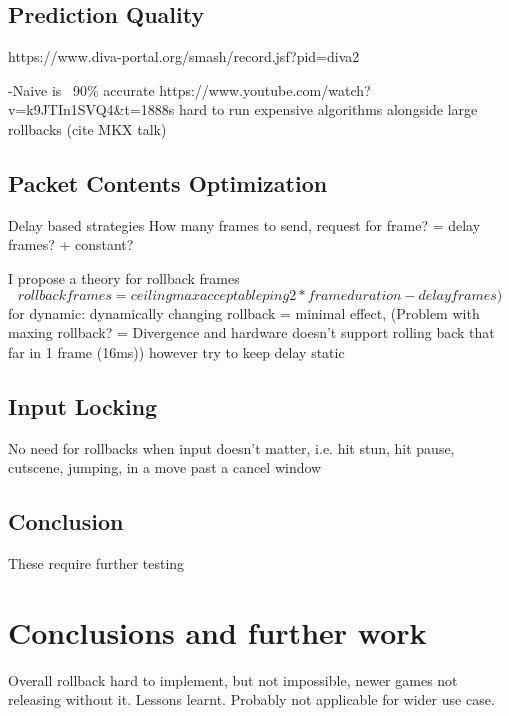 \documentclass{entcs}
\begin{document}
\subsection{Prediction Quality}
https://www.diva-portal.org/smash/record.jsf?pid=diva2%

-Naive is ~90\% accurate {https://www.youtube.com/watch?v=k9JTIn1SVQ4\&t=1888s}
hard to run expensive algorithms alongside large rollbacks (cite MKX talk)

\subsection{Packet Contents Optimization}
Delay based strategies
How many frames to send, request for frame? = delay frames? + constant?

I propose a theory for rollback frames 
\[rollback frames = ceiling{max acceptable ping}{2*frameduration} - delay frames)\]
for dynamic: dynamically changing rollback = minimal effect, (Problem with maxing rollback? = Divergence and hardware doesn't support rolling back that far in 1 frame (16ms))
however try to keep delay static \cite{sec:Industry Issues}

\subsection{Input Locking}
No need for rollbacks when input doesn't matter, i.e. hit stun, hit pause, cutscene, jumping, in a move past a cancel window \cite{sec:Industry Issues}

\subsection{Conclusion}
These require further testing

\section{Conclusions and further work}

Overall rollback hard to implement, but not impossible, newer games not releasing without it. Lessons learnt. Probably not applicable for wider use case. 
\end{document}
